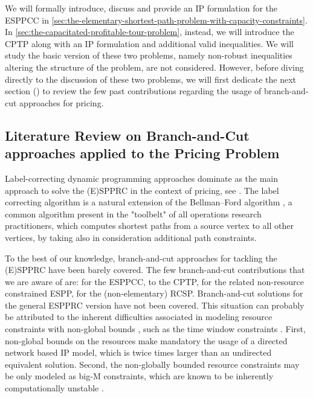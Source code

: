 \medskip

We will formally introduce, discuss and provide an IP formulation
for the ESPPCC in \cref{sec:the-elementary-shortest-path-problem-with-capacity-constraints}.
In \cref{sec:the-capacitated-profitable-tour-problem}, instead,
we will introduce the CPTP along with an IP formulation and additional valid inequalities.
We will study the basic version of these two problems, namely
non-robust inequalities altering the structure of the problem, are not considered.
However, before diving directly to the discussion of these two problems,
we will first dedicate the next section ()
to review the few past contributions regarding
the usage of branch-and-cut approaches for pricing.

\subsection{Literature Review on Branch-and-Cut approaches applied to the Pricing Problem}
\label{sec:the-pricing-problem-literature-review}

Label-correcting dynamic programming approaches
dominate as the main approach to solve the (E)SPPRC in the context of pricing,
see \cite{desrochers1992, feillet2004, righini2004, righini2006, boland2006, righini2008, pugliese2010, baldacci2011, lozano2013, lozano2016, sadykov2021bucket}.
The label correcting algorithm is a natural extension of the Bellman–Ford algorithm \parencite{bellman1958, fordjr1956},
a common algorithm present in the "toolbelt" of all operations research practitioners,
which computes shortest paths from a source vertex to all other vertices,
by taking also in consideration additional path constraints.

To the best of our knowledge,
branch-and-cut approaches for tackling the (E)SPPRC have been barely covered.
The few branch-and-cut contributions that we are aware of are:
\textcite{jepsen2008branchandcut} for the ESPPCC,
\textcite{jepsen2011,jepsen2014} to the CPTP,
\textcite{taccari2016, drexl2014} for the related non-resource constrained ESPP,
\textcite{horvath2016} for the (non-elementary) RCSP.
Branch-and-cut solutions for the general ESPPRC version have not been covered.
This situation can probably be attributed to the
inherent difficulties associated in modeling
resource constraints with non-global bounds \parencite{jepsen2008branchandcut},
such as the time window constraints .
First, non-global bounds on the resources make mandatory the usage of
a directed network based IP model,
which is twice times larger than an undirected equivalent solution.
Second, the non-globally bounded resource constraints may be only modeled as
big-M constraints, which are known to be inherently computationally unstable \parencite{jepsen2008branchandcut}.

